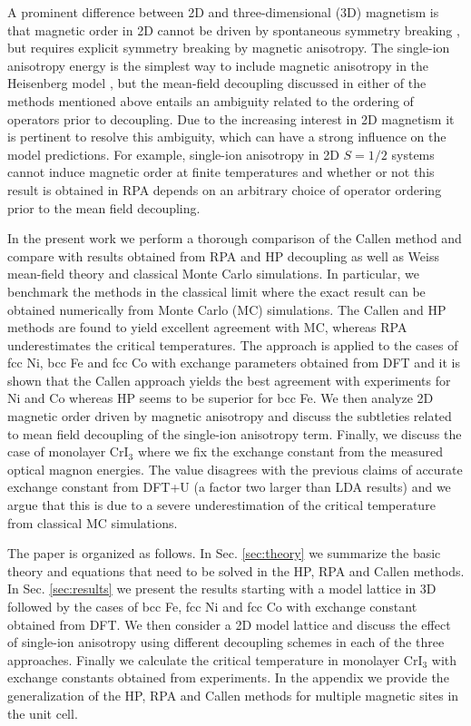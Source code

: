 \documentclass[aps,prb,reprint,floatfix,superscriptaddress]{revtex4-2}
\begin{document}
A prominent difference between 2D and three-dimensional (3D) magnetism is that magnetic order in 2D cannot be driven by spontaneous symmetry breaking \cite{Mermin1966}, but requires explicit symmetry breaking by magnetic anisotropy. The single-ion anisotropy energy is the simplest way to include magnetic anisotropy in the Heisenberg model \cite{Torelli_2019}, but the mean-field decoupling discussed in either of the methods mentioned above entails an ambiguity related to the ordering of operators prior to decoupling. Due to the increasing interest in 2D magnetism it is pertinent to resolve this ambiguity, which can have a strong influence on the model predictions. For example, single-ion anisotropy in 2D $S=1/2$ systems cannot induce magnetic order at finite temperatures and whether or not this result is obtained in RPA depends on an arbitrary choice of operator ordering prior to the mean field decoupling.

In the present work we perform a thorough comparison of the Callen method and compare with results obtained from RPA and HP decoupling as well as Weiss mean-field theory and classical Monte Carlo simulations. In particular, we benchmark the methods in the classical limit where the exact result can be obtained numerically from Monte Carlo (MC) simulations. The Callen and HP methods are found to yield excellent agreement with MC, whereas RPA underestimates the critical temperatures. The approach is applied to the cases of fcc Ni, bcc Fe and fcc Co with exchange parameters obtained from DFT and it is shown that the Callen approach yields the best agreement with experiments for Ni and Co whereas HP seems to be superior for bcc Fe. We then analyze 2D magnetic order driven by magnetic anisotropy and discuss the subtleties related to mean field decoupling of the single-ion anisotropy term. Finally, we discuss the case of monolayer CrI$_3$ where we fix the exchange constant from the measured optical magnon energies. The value disagrees with the previous claims of accurate exchange constant from DFT+U (a factor two larger than LDA results) and we argue that this is due to a severe underestimation of the critical temperature from classical MC simulations.

The paper is organized as follows. In Sec. \ref{sec:theory} we summarize the basic theory and equations that need to be solved in the HP, RPA and Callen methods. In Sec. \ref{sec:results} we present the results starting with a model lattice in 3D followed by the cases of bcc Fe, fcc Ni and fcc Co with exchange constant obtained from DFT. We then consider a 2D model lattice and discuss the effect of single-ion anisotropy using different decoupling schemes in each of the three approaches. Finally we calculate the critical temperature in monolayer CrI$_3$ with exchange constants obtained from experiments. In the appendix we provide the generalization of the HP, RPA and Callen methods for multiple magnetic sites in the unit cell.
\end{document}
